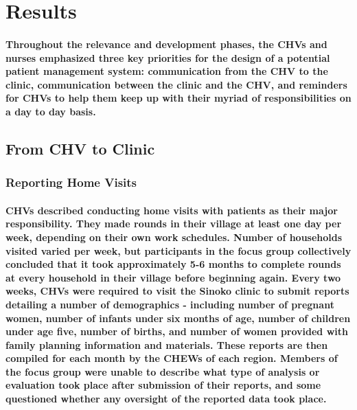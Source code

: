 \section{Results}
\paragraph{Throughout the relevance and development phases, the CHVs and nurses emphasized three key priorities for the design of a potential patient management system: communication from the CHV to the clinic, communication between the clinic and the CHV, and reminders for CHVs to help them keep up with their myriad of responsibilities on a day to day basis.} 

\subsection{From CHV to Clinic}
\subsubsection{Reporting Home Visits}
\paragraph{CHVs described conducting home visits with patients as their major responsibility. They made rounds in their village at least one day per week, depending on their own work schedules. Number of households visited varied per week, but participants in the focus group collectively concluded that it took approximately 5-6 months to complete rounds at every household in their village before beginning again. Every two weeks, CHVs were required to visit the Sinoko clinic to submit reports detailing a number of demographics - including number of pregnant women, number of infants under six months of age, number of children under age five, number of births, and number of women provided with family planning information and materials. These reports are then compiled for each month by the CHEWs of each region.  Members of the focus group were unable to describe what type of analysis or evaluation took place after submission of their reports, and some questioned whether any oversight of the reported data took place.}

